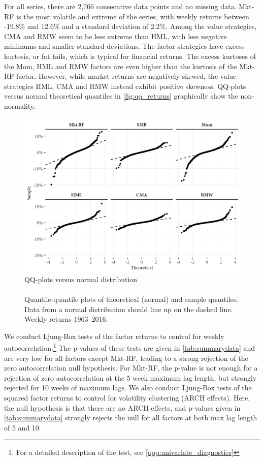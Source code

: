 For all series, there are 2,766 consecutive data points and no missing data. Mkt-RF is the most volatile and extreme of the series, with weekly returns between -19.8\% and 12.6\% and a standard deviation of 2.2\%. Among the value strategies, CMA and RMW seem to be less extreme than HML, with less negative minimums and smaller standard deviations. The factor strategies have excess kurtosis, or fat tails, which is typical for financial returns. The excess kurtoses of the Mom, HML and RMW factors are even higher than the kurtosis of the Mkt-RF factor. However, while market returns are negatively skewed, the value strategies HML, CMA and RMW instead exhibit positive skewness. QQ-plots versus normal theoretical quantiles in \autoref{fig:qq_returns} graphically show the non-normality.
\begin{figure}[htbp]
  \centering
  \footnotesize
  \renewcommand{\arraystretch}{1.2}
  \caption{QQ-plots versus normal distribution \\ \quad \\ 
  Quantile-quantile plots of theoretical (normal) and sample quantiles. Data from a normal distribution should line up on the dashed line. Weekly returns 1963--2016.}
  \label{fig:qq_returns}
  \includegraphics[scale=1]{graphics/qq_returns.png}
\end{figure}

We conduct Ljung-Box tests of the factor returns to control for weekly autocorrelation.\footnote{For a detailed description of the test, see \autoref{app:univariate_diagnostics}} The p-values of these tests are given in \autoref{tab:summarydata} and are very low for all factors except Mkt-RF, leading to a strong rejection of the zero autocorrelation null hypothesis. For Mkt-RF, the p-value is not enough for a rejection of zero autocorrelation at the 5 week maximum lag length, but strongly rejected for 10 weeks of maximum lags. We also conduct Ljung-Box tests of the squared factor returns to control for volatility clustering (ARCH effects). Here, the null hypothesis is that there are no ARCH effects, and p-values given in \autoref{tab:summarydata} strongly rejects the null for all factors at both max lag length of 5 and 10.

